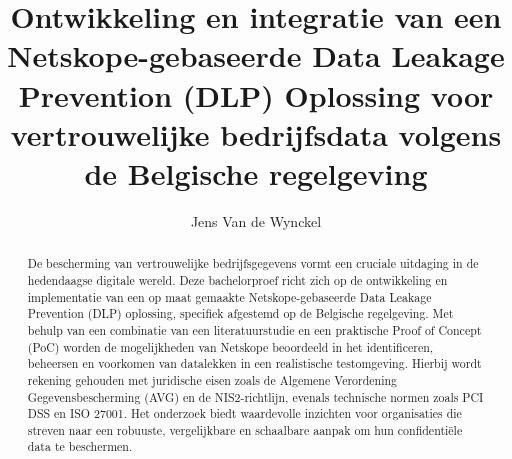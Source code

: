 \documentclass{hogent-article}
\title{Ontwikkeling en integratie van een Netskope-gebaseerde Data Leakage Prevention (DLP) Oplossing voor vertrouwelijke bedrijfsdata volgens de Belgische regelgeving}
\author{Jens Van de Wynckel}
\begin{document}
\begin{abstract}
  De bescherming van vertrouwelijke bedrijfsgegevens vormt een cruciale uitdaging in de hedendaagse digitale wereld. 
  Deze bachelorproef richt zich op de ontwikkeling en implementatie van een op maat gemaakte Netskope-gebaseerde Data Leakage Prevention (DLP) oplossing, 
  specifiek afgestemd op de Belgische regelgeving. 
  Met behulp van een combinatie van een literatuurstudie en een praktische Proof of Concept (PoC) worden de mogelijkheden van Netskope beoordeeld in het identificeren, 
  beheersen en voorkomen van datalekken in een realistische testomgeving. Hierbij wordt rekening gehouden met juridische eisen zoals de Algemene Verordening Gegevensbescherming (AVG) 
  en de NIS2-richtlijn, evenals technische normen zoals PCI DSS en ISO 27001. 
  Het onderzoek biedt waardevolle inzichten voor organisaties die streven naar een robuuste, vergelijkbare en schaalbare aanpak om hun confidentiële data te beschermen.
\end{abstract}

\tableofcontents



\printbibliography[heading=bibintoc]
\end{document}
